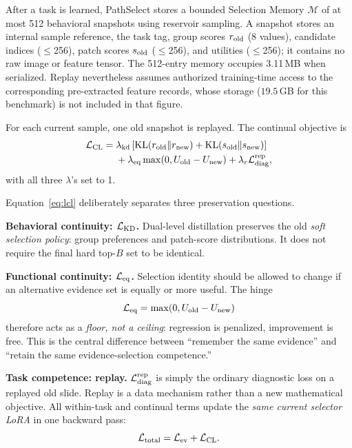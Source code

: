 \documentclass{article}
\def\L{{\cal L}}
\newcommand{\Mem}{\mathcal{M}}
\begin{document}
After a task is learned, PathSelect stores a bounded Selection Memory
$\Mem$ of at most 512 behavioral snapshots using reservoir sampling.
A snapshot stores an internal sample reference, the task tag, group scores $r_{\rm old}$ (8 values), candidate indices ($\le$256), patch scores $s_{\rm old}$ ($\le$256), and utilities ($\le$256); it contains no raw image or feature tensor. The 512-entry memory occupies 3.11\,MB when serialized. Replay nevertheless assumes authorized training-time access to the corresponding pre-extracted feature records, whose storage ($19.5$\,GB for this benchmark) is not included in that figure.

For each current sample, one old snapshot is replayed.
The continual objective is
\begin{align}
\L_{\mathrm{CL}}
={}&
\lambda_{\mathrm{kd}}
\left[
\mathrm{KL}(r_{\mathrm{old}}\Vert r_{\mathrm{new}})
+
\mathrm{KL}(s_{\mathrm{old}}\Vert s_{\mathrm{new}})
\right]
\nonumber\\
&+
\lambda_{\mathrm{eq}}
\max(0,U_{\mathrm{old}}-U_{\mathrm{new}})
+
\lambda_r \L_{\mathrm{diag}}^{\mathrm{rep}},
\label{eq:lcl}
\end{align}
with all three $\lambda$'s set to 1.

Equation~\ref{eq:lcl} deliberately separates three preservation questions.

\textbf{Behavioral continuity: $\L_{\rm KD}$.}
Dual-level distillation preserves the old \emph{soft selection policy}: group preferences and patch-score distributions.
It does not require the final hard top-$B$ set to be identical.

\textbf{Functional continuity: $\L_{\rm eq}$.}
Selection identity should be allowed to change if an alternative evidence set is equally or more useful.
The hinge
\[
\L_{\rm eq}=\max(0,U_{\rm old}-U_{\rm new})
\]
therefore acts as a \emph{floor, not a ceiling}: regression is penalized, improvement is free.
This is the central difference between ``remember the same evidence'' and ``retain the same evidence-selection competence.''

\textbf{Task competence: replay.}
$\L_{\mathrm{diag}}^{\mathrm{rep}}$ is simply the ordinary diagnostic loss on a replayed old slide.
Replay is a data mechanism rather than a new mathematical objective.
All within-task and continual terms update the \emph{same current selector LoRA} in one backward pass:
\[
\L_{\mathrm{total}}=\L_{\mathrm{ev}}+\L_{\mathrm{CL}}.
\]

\end{document}
